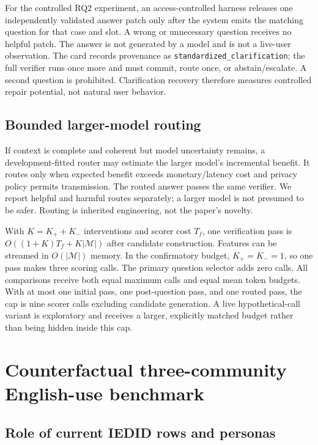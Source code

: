 \documentclass[preprint,12pt,authoryear]{elsarticle}
\begin{document}
For the controlled RQ2 experiment, an access-controlled harness releases one
independently validated answer patch only after the system emits the matching
question for that case and slot. A wrong or unnecessary question receives no
helpful patch. The answer is not generated by a model and is not a live-user
observation. The card records provenance as
\texttt{standardized\_clarification}; the full verifier runs once more and
must commit, route once, or abstain/escalate. A second question is prohibited.
Clarification recovery therefore measures controlled repair potential, not
natural user behavior.

\subsection{Bounded larger-model routing}

If context is complete and coherent but model uncertainty remains, a
development-fitted router may estimate the larger model's incremental benefit.
It routes only when expected benefit exceeds monetary/latency cost and privacy
policy permits transmission. The routed answer passes the same verifier. We
report helpful and harmful routes separately; a larger model is not presumed
to be safer. Routing is inherited engineering, not the paper's novelty.

With $K=K_++K_-$ interventions and scorer cost $T_f$, one verification pass is
$O((1+K)T_f+K|\mathcal{M}|)$ after candidate construction. Features can be
streamed in $O(|\mathcal{M}|)$ memory. In the confirmatory budget,
$K_+=K_-=1$, so one pass makes three scoring calls. The primary question
selector adds zero calls. All comparisons receive both equal maximum calls and
equal mean token budgets. With at most one initial pass, one post-question
pass, and one routed pass, the cap is nine scorer calls excluding candidate
generation. A live hypothetical-call variant is exploratory and receives a
larger, explicitly matched budget rather than being hidden inside this cap.

\section{Counterfactual three-community English-use benchmark}

\subsection{Role of current IEDID rows and personas}
\end{document}
